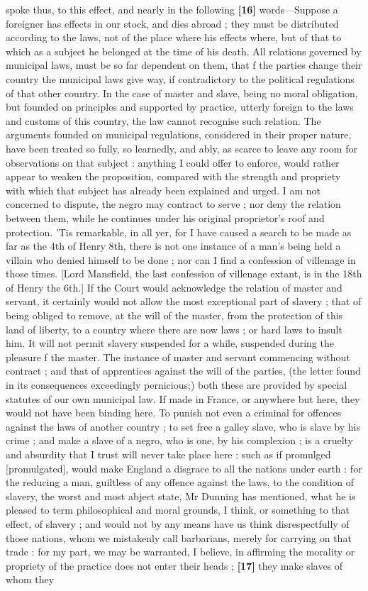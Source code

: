 \documentclass[a4paper]{article}
\begin{document}
spoke thus, to this effect, and nearly in the following \textbf{[16]} words---Suppose a foreigner has effects in our stock, and dies abroad ; they must be distributed according to the laws, not of the place where his effects where, but of that to which as a subject he belonged at the time of his death. All relations governed by municipal laws, must be so far dependent on them, that f the parties change their country the municipal laws give way, if contradictory to the political regulations of that other country. In the case of master and slave, being no moral obligation, but founded on principles and supported by practice, utterly foreign to the laws and customs of this country, the law cannot recognise such relation. The arguments founded on municipal regulations, considered in their proper nature, have been treated so fully, so learnedly, and ably, as scarce to leave any room for observations on that subject : anything I could offer to enforce, would rather appear to weaken the proposition, compared with the strength and propriety with which that subject has already been explained and urged. I am not concerned to dispute, the negro may contract to serve ; nor deny the relation between them, while he continues under his original proprietor's roof and protection. 'Tis remarkable, in all yer, for I have caused a search to be made as far as the 4th of Henry 8th, there is not one instance of a man's being held a villain who denied himself to be done ; nor can I find a confession of villenage in those times. [Lord Mansfield, the last confession of villenage extant, is in the 18th of Henry the 6th.] If the Court would acknowledge the relation of master and servant, it certainly would not allow the most exceptional part of slavery ; that of being obliged to remove, at the will of the master, from the protection of this land of liberty, to a country where there are now laws ; or hard laws to insult him. It will not permit slavery suspended for a while, suspended during the pleasure f the master. The instance of master and servant commencing without contract ; and that of apprentices against the will of the parties, (the letter found in its consequences exceedingly pernicious;) both these are provided by special statutes of our own municipal law. If made in France, or anywhere but here, they would not have been binding here. To punish not even a criminal for offences against the laws of another country ; to set free a galley slave, who is slave by his crime ; and make a slave of a negro, who is one, by his complexion ; is a cruelty and absurdity that I trust will never take place here : such as  if promulged [promulgated], would make England a disgrace to all the nations under earth : for the reducing a man, guiltless of any offence against the laws, to the condition of slavery, the worst and most abject state, Mr Dunning has mentioned, what he is pleased to term philosophical and moral grounds, I think, or something to that effect, of slavery ; and would not by any means have us think disrespectfully of those nations, whom we mistakenly call barbarians, merely for carrying on that trade : for my part, we may be warranted, I believe, in affirming the morality or propriety of the practice does not enter their heads ; \textbf{[17]} they make slaves of whom they 
\end{document}
